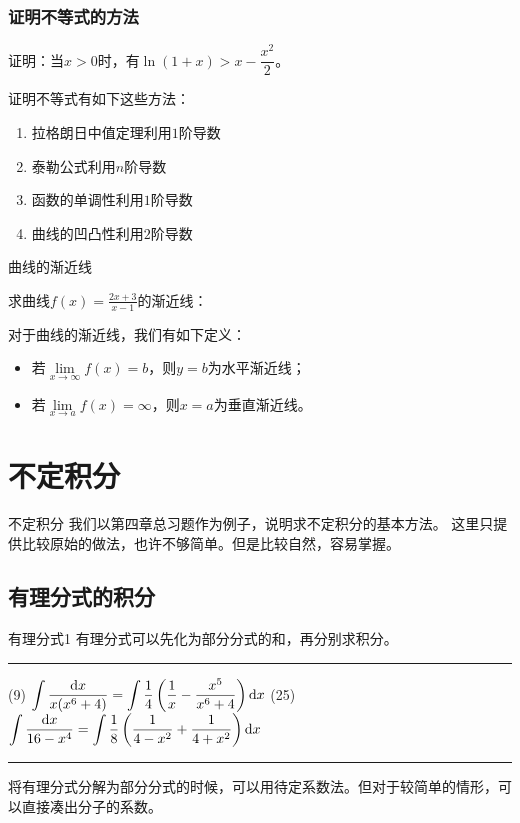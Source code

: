 \documentclass[14pt,notheorems,leqno,xcolor={rgb}]{beamer} %
\begin{document}
\begin{frame}
\frametitle{证明不等式的方法}
\begin{example}
证明：当$x>0$时，有$\ln(1+x)>x-\dfrac{x^2}{2}$。
\end{example}
\vpause
\begin{remark*}
证明不等式有如下这些方法：
\begin{enumerate}
  \item 拉格朗日中值定理\cdotfill 利用$1$阶导数
  \ifligong\item 泰勒公式\cdotfill 利用$n$阶导数\fi
  \item 函数的单调性\cdotfill 利用$1$阶导数
  \item 曲线的凹凸性\cdotfill 利用$2$阶导数
\end{enumerate}
\end{remark*}
\end{frame}

\begin{frame}{曲线的渐近线}
\begin{example}
求曲线$f(x)=\frac{2x+3}{x-1}$的渐近线：
\end{example}
\pause
\begin{fact*}
对于曲线的渐近线，我们有如下定义：
\begin{itemize}
\item 若$\lim\limits_{x\to\infty}f(x)=b$，则$y=b$为水平渐近线；
\item 若$\lim\limits_{x\to a}f(x)=\infty$，则$x=a$为垂直渐近线。
\end{itemize}
\end{fact*}
\end{frame}

\section{不定积分}

\begin{frame}{不定积分}
我们以第四章总习题作为例子，说明求不定积分的基本方法。
\vpause
这里只提供比较原始的做法，也许不够简单。\pause 但是比较自然，容易掌握。
\end{frame}

\subsection{有理分式的积分}

\begin{frame}{有理分式1}
有理分式可以先化为部分分式的和，再分别求积分。
\vspace{0.8em}\hrule\vpause
(9) $\displaystyle\int\frac{\mathop{}\!\mathrm{d} x}{x(x^6+4)}=\int\frac14\left(\frac{1}{x}-\frac{x^5}{x^6+4}\right)\mathop{}\!\mathrm{d} x$\ppause
(25) $\displaystyle\int\frac{\mathop{}\!\mathrm{d} x}{16-x^4}=\int\frac18\left(\frac{1}{4-x^2}+\frac{1}{4+x^2}\right)\mathop{}\!\mathrm{d} x$
\vspace{0.8em}\hrule\vpause
将有理分式分解为部分分式的时候，可以用待定系数法。但对于较简单的情形，可以直接凑出分子的系数。
\end{frame}
\end{document}
